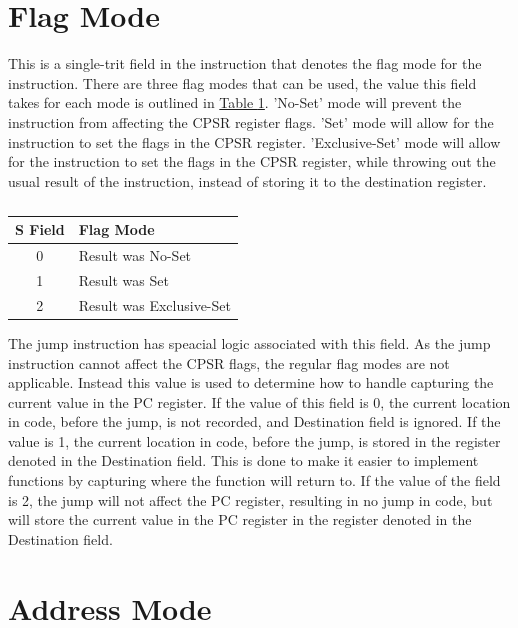 \documentclass[12pt]{article}
\begin{document}
\section{Flag Mode} \label{sec:Flag Mode}

This is a single-trit field in the instruction that denotes the flag mode for the instruction. There are
three flag modes that can be used, the value this field takes for each mode is outlined in
\hyperref[tab:S Field Values]{Table \ref{tab:S Field Values}}. 'No-Set' mode will prevent the instruction from
affecting the CPSR register flags. 'Set' mode will allow for the instruction to set the flags in the CPSR
register. 'Exclusive-Set' mode will allow for the instruction to set the flags in the CPSR register, while
throwing out the usual result of the instruction, instead of storing it to the destination register.

\begin{table}[h!]
    \centering
    \caption{}
    \label{tab:S Field Values}
    \begin{tabular}{|c|l|}
        \hline
        \textbf{S} Field & Flag Mode \\ \hline
        0 & Result was No-Set \\ \hline
        1 & Result was Set \\ \hline
        2 & Result was Exclusive-Set \\ \hline
    \end{tabular}
\end{table}

The jump instruction has speacial logic associated with this field. As the jump instruction cannot
affect the CPSR flags, the regular flag modes are not applicable. Instead this value is used to
determine how to handle capturing the current value in the PC register. If the value of this field
is 0, the current location in code, before the jump, is not recorded, and Destination field is
ignored. If the value is 1, the current location in code, before the jump, is stored in the register
denoted in the Destination field. This is done to make it easier to implement functions by capturing
where the function will return to. If the value of the field is 2, the jump will not affect the PC
register, resulting in no jump in code, but will store the current value in the PC register in
the register denoted in the Destination field.

\section{Address Mode} \label{sec:Address Mode}
\end{document}
